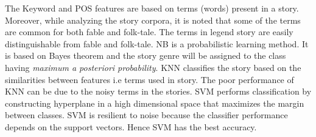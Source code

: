 \documentclass[times, 11pt, a4paper]{article}
\begin{document}
	The Keyword and POS features are based on terms (words) present in a story. Moreover, while analyzing the story corpora, it is noted that some of the terms are common for both fable and folk-tale. The terms in legend story are easily distinguishable from fable and folk-tale. NB is a probabilistic learning method. It is based on Bayes theorem and the story genre will be assigned to the class having \textit{maximum a posteriori probability}. KNN classifies the story based on the similarities between features i.e terms used in story. The poor performance of KNN can be due to the noisy terms in the stories. SVM performs classification by constructing hyperplane in a high dimensional space that maximizes the margin between classes. SVM is resilient to noise because the classifier performance depends on the support vectors. Hence SVM has the best accuracy. 


\end{document}
